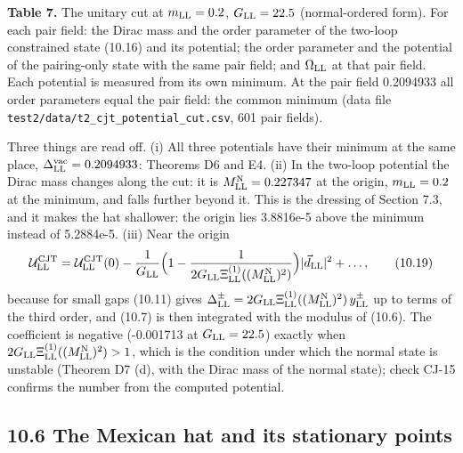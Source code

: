 \documentclass[
  10pt,
]{article}
\begin{document}
\textbf{Table 7.} The unitary cut at \(m_{\rm LL}=0.2\),
\(G_{\rm LL}=22.5\) (normal-ordered form). For each pair field: the
Dirac mass and the order parameter of the two-loop constrained state
(10.16) and its potential; the order parameter and the potential of the
pairing-only state with the same pair field; and \(\Omega_{\rm LL}\) at
that pair field. Each potential is measured from its own minimum. At the
pair field 0.2094933 all order parameters equal the pair field: the
common minimum (data file
\texttt{test2/data/t2\_cjt\_potential\_cut.csv}, 601 pair fields).

Three things are read off. (i) All three potentials have their minimum
at the same place, \(\Delta^{\rm vac}_{\rm LL}=0.2094933\): Theorems D6
and E4. (ii) In the two-loop potential the Dirac mass changes along the
cut: it is \(M^{\rm N}_{\rm LL}=0.227347\) at the origin,
\(m_{\rm LL}=0.2\) at the minimum, and falls further beyond it. This is
the dressing of Section 7.3, and it makes the hat shallower: the origin
lies 3.8816e-5 above the minimum instead of 5.2884e-5. (iii) Near the
origin
\[\mathcal U^{\rm CJT}_{\rm LL}=\mathcal U^{\rm CJT}_{\rm LL}(0)-\frac1{G_{\rm LL}}\Big(1-\frac1{2G_{\rm LL}\Xi^{(1)}_{\rm LL}((M^{\rm N}_{\rm LL})^2)}\Big)\lvert\vec d_{\rm LL}\rvert^2+\dots,\tag{10.19}\]
because for small gaps (10.11) gives
\(\Delta^\pm_{\rm LL}=2G_{\rm LL}\Xi^{(1)}_{\rm LL}((M^{\rm N}_{\rm LL})^2)\,y^\pm_{\rm LL}\)
up to terms of the third order, and (10.7) is then integrated with the
modulus of (10.6). The coefficient is negative (-0.001713 at
\(G_{\rm LL}=22.5\)) exactly when
\(2G_{\rm LL}\Xi^{(1)}_{\rm LL}((M^{\rm N}_{\rm LL})^2)>1\), which is
the condition under which the normal state is unstable (Theorem D7 (d),
with the Dirac mass of the normal state); check CJ-15 confirms the
number from the computed potential.

\hypertarget{the-mexican-hat-and-its-stationary-points}{%
\subsection{10.6 The Mexican hat and its stationary
points}\label{the-mexican-hat-and-its-stationary-points}}
\end{document}
